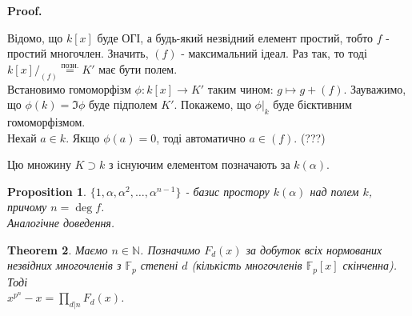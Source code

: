 \documentclass[a4paper, 10pt]{article}
\makeatletter
\theoremstyle{theoremdd}
\newtheorem{theorem}{Theorem}[subsection]
\theoremstyle{theoremdd}
\theoremstyle{theoremdd}
\theoremstyle{theoremdd}
\theoremstyle{theoremdd}
\newtheorem{proposition}[theorem]{Proposition}
\theoremstyle{theoremdd}
\theoremstyle{theoremdd}
\theoremstyle{theoremdd}
\renewenvironment{proof}[1][Proof.\\]{\par
\pushQED{\hfill \qed}%
\normalfont \topsep6\p@\@plus6\p@\relax
\trivlist
\item\relax
{\bfseries
#1\@addpunct{.}}\hspace\labelsep\ignorespaces
}{%
\popQED\endtrivlist\@endpefalse
}
\makeatother
\begin{document}
\begin{proof}
Відомо, що $k[x]$ буде ОГІ, а будь-який незвідний елемент простий, тобто $f$ - простий многочлен. Значить, $(f)$ - максимальний ідеал. Раз так, то тоді $k[x]/_{(f)} \overset{\text{позн.}}{=} K'$ має бути полем.\\
Встановимо гомоморфізм $\phi: k[x] \to K'$ таким чином: $g \mapsto g + (f)$. Зауважимо, що $\phi(k) = \Im \phi$ буде підполем $K'$. Покажемо, що $\phi|_k$ буде бієктивним гомоморфізмом.\\
Нехай $a \in k$. Якщо $\phi(a) = 0$, тоді автоматично $a \in (f)$. (???)
\end{proof}

Цю множину $K \supset k$ з існуючим елементом позначають за $k(\alpha)$.

\begin{proposition}
$\{1,\alpha,\alpha^2,\dots,\alpha^{n-1}\}$ - базис простору $k(\alpha)$ над полем $k$, причому $n = \deg f$.\\
\textit{Аналогічне доведення.}
\end{proposition}

\begin{theorem}
Маємо $n \in \mathbb{N}$. Позначимо $F_d(x)$ за добуток всіх нормованих незвідних многочленів з $\mathbb{F}_p$ степені $d$ (кількість многочленів $\mathbb{F}_p[x]$ скінченна). Тоді\\
$x^{p^n} - x = \displaystyle\prod_{d | n} F_d(x)$.
\end{theorem}
\end{document}
